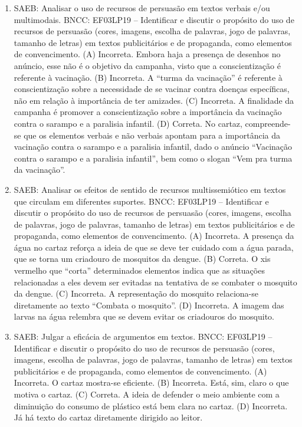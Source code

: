 \begin{enumerate}
\item
SAEB: Analisar o uso de recursos de persuasão em textos verbais e/ou multimodais.
BNCC: EF03LP19 -- Identificar e discutir o propósito do uso de recursos de
persuasão (cores, imagens, escolha de palavras, jogo de palavras,
tamanho de letras) em textos publicitários e de propaganda, como
elementos de convencimento.
(A) Incorreta. Embora haja a presença de desenhos no anúncio, esse não é
o objetivo da campanha, visto que a conscientização é referente à
vacinação.
(B) Incorreta. A ``turma da vacinação'' é referente à conscientização
sobre a necessidade de se vacinar contra doenças específicas, não em
relação à importância de ter amizades.
(C) Incorreta. A finalidade da campanha é promover a conscientização sobre a
importância da vacinação contra o sarampo e a paralisia infantil.
(D) Correta. No cartaz, compreende-se que os elementos verbais e não
verbais apontam para a importância da vacinação contra o sarampo e a
paralisia infantil, dado o anúncio ``Vacinação contra o sarampo e a
paralisia infantil'', bem como o slogan ``Vem pra turma da vacinação''.

\item
SAEB: Analisar os efeitos de sentido de recursos multissemiótico em textos que circulam em diferentes suportes.
BNCC: EF03LP19 -- Identificar e discutir o propósito do uso de recursos de
persuasão (cores, imagens, escolha de palavras, jogo de palavras,
tamanho de letras) em textos publicitários e de propaganda, como
elementos de convencimento.
(A) Incorreta. A presença da água no cartaz reforça a ideia de que se deve ter cuidado com a água parada, que se torna um criadouro de mosquitos da dengue.
(B) Correta. O xis vermelho que ``corta'' determinados elementos indica que as situações relacionadas a eles devem ser evitadas na tentativa de se combater o mosquito da dengue.
(C) Incorreta. A representação do mosquito relaciona-se diretamente ao texto ``Combata o mosquito''.
(D) Incorreta. A imagem das larvas na água relembra que se devem evitar os criadouros do mosquito.

\item
SAEB: Julgar a eficácia de argumentos em textos.
BNCC: EF03LP19 -- Identificar e discutir o propósito do uso de recursos de
persuasão (cores, imagens, escolha de palavras, jogo de palavras,
tamanho de letras) em textos publicitários e de propaganda, como
elementos de convencimento.
(A) Incorreta. O cartaz mostra-se eficiente.
(B) Incorreta. Está, sim, claro o que motiva o cartaz.
(C) Correta. A ideia de defender o meio ambiente com a diminuição do consumo de plástico está bem clara no cartaz.
(D) Incorreta. Já há texto do cartaz diretamente dirigido ao leitor.
\end{enumerate}

